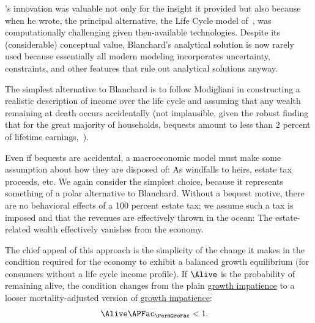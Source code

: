 \documentclass[BufferStockTheory]{subfiles}
\begin{document}

\hypertarget{Modigliani-Lives}{}

\cite{blanchardFinite}'s innovation was valuable not only for the insight it provided but also because when he wrote, the principal alternative, the Life Cycle model of~\cite{modiglianiWealth}, was computationally challenging given then-available technologies. Despite its (considerable) conceptual value, Blanchard's analytical solution is now rarely used because essentially all modern modeling incorporates uncertainty, constraints, and other features that rule out analytical solutions anyway.%

The simplest alternative to Blanchard is to follow Modigliani in constructing a realistic description of income over the life cycle and assuming that any wealth remaining at death occurs accidentally (not implausible, given the robust finding that for the great majority of households, bequests amount to less than 2 percent of lifetime earnings,~\cite{hendricksBequests,hendricksSmallBequests}).

Even if bequests are accidental, a macroeconomic model must make some assumption about how they are disposed of: As windfalls to heirs, estate tax proceeds, etc. We again consider the simplest choice, because it represents something of a polar alternative to Blanchard. Without a bequest motive, there are no behavioral effects of a 100 percent estate tax; we assume such a tax is imposed and that the revenues are effectively thrown in the ocean:  The estate-related wealth effectively vanishes from the economy.

The chief appeal of this approach is the simplicity of the change it makes in the condition required for the economy to exhibit a balanced growth equilibrium (for consumers without a life cycle income profile).  If $\Alive$ is the probability of remaining alive, the condition changes from the plain \hyperlink{GICRaw}{growth impatience} to a looser mortality-adjusted version of \hyperlink{GICRaw}{growth impatience}:
\hypertarget{GICLivModDefn}{}
\begin{align}
  \Alive  \APFac_{\PermGroFac} & < 1. \label{eq:GICLivMod}
\end{align}
\end{document}
